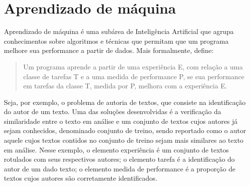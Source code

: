 \chapter{Aprendizado de máquina}

Aprendizado de máquina é uma subárea de Inteligência Artificial que agrupa conhecimentos sobre algoritmos e técnicas que permitam que um programa melhore sua performance a partir de dados. Mais formalmente, \cite[p.2, tradução nossa]{Tom_mitchell} define:

\begin{quote}
Um programa aprende a partir de uma experiência E, com relação a uma classe de tarefas T e a uma medida de performance P, se sua performance em tarefas da classe T, medida por P, melhora com a experiência E.
\end{quote}

Seja, por exemplo, o problema de autoria de textos, que consiste na identificação do autor de um texto. Uma das soluções desenvolvidas é a verificação da similaridade entre o texto em análise e um conjunto de textos cujos autores já sejam conhecidos, denominado conjunto de treino, sendo reportado como o autor aquele cujos textos contidos no conjunto de treino sejam mais similares ao texto em análise. Nesse exemplo, o elemento experiência é um conjunto de textos rotulados com seus respectivos autores; o elemento tarefa é a identificação do autor de um dado texto; o elemento medida de performance é a proporção de textos cujos autores são corretamente identificados.

\cite{Mitchell_discipline}


\cite{ML_debt} 
\cite{ML_know}
